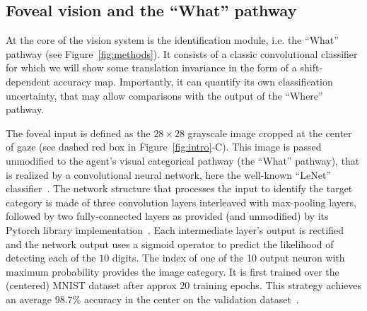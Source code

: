%
\subsection{Foveal vision and the ``What'' pathway}
%
At the core of the vision system is the identification module, i.e. the ``What'' pathway (see Figure~\ref{fig:methods}). It consists of a classic convolutional classifier for which we will show some translation invariance in the form of a shift-dependent accuracy map. Importantly, it can quantify its own classification uncertainty, that may allow comparisons with the output of the ``Where'' pathway.

The foveal input is defined as the $28\times 28$ grayscale image cropped at the center of gaze (see dashed red box in Figure~\ref{fig:intro}-C).
This image is passed unmodified to the agent's visual categorical pathway (the ``What'' pathway), that is realized by a convolutional neural network, here the well-known ``LeNet'' classifier~\cite{Lecun1998}. The network structure that processes the input to identify the target category is made of three convolution layers interleaved with max-pooling layers, followed by two fully-connected layers as provided (and unmodified) by its Pytorch library implementation~\cite{NEURIPS2019_9015}. Each intermediate layer's output is rectified and the network output uses a sigmoid operator to predict the likelihood of detecting each of the $10$ digits. The index of one of the 10 output neuron with maximum probability provides the image category. It is first trained over the (centered) MNIST dataset after approx $20$ training epochs. This strategy achieves an average $98.7\%$ accuracy in the center on the validation dataset~\cite{Lecun1998}.%

